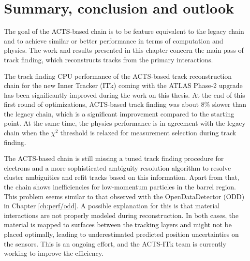 \section{Summary, conclusion and outlook}

The goal of the ACTS-based chain is to be feature equivalent to the legacy chain and to achieve similar or better performance in terms of computation and physics. The work and results presented in this chapter concern the main pass of track finding, which reconstructs tracks from the primary interactions.

The track finding CPU performance of the ACTS-based track reconstruction chain for the new Inner Tracker (ITk) coming with the ATLAS Phase-2 upgrade has been significantly improved during the work on this thesis. At the end of this first round of optimizations, ACTS-based track finding was about 8\% slower than the legacy chain, which is a significant improvement compared to the starting point. At the same time, the physics performance is in agreement with the legacy chain when the $\chi^2$ threshold is relaxed for measurement selection during track finding.

The ACTS-based chain is still missing a tuned track finding procedure for electrons and a more sophisticated ambiguity resolution algorithm to resolve cluster ambiguities and refit tracks based on this information. Apart from that, the chain shows inefficiencies for low-momentum particles in the barrel region. This problem seems similar to that observed with the OpenDataDetector (ODD) in Chapter \ref{ch:perf/odd}. A possible explanation for this is that material interactions are not properly modeled during reconstruction. In both cases, the material is mapped to surfaces between the tracking layers and might not be placed optimally, leading to underestimated predicted position uncertainties on the sensors. This is an ongoing effort, and the ACTS-ITk team is currently working to improve the efficiency.





